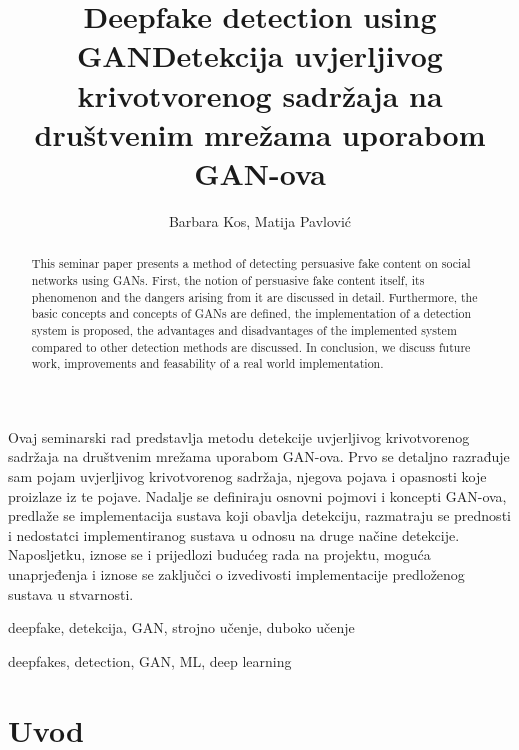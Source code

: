 \documentclass[seminarski, times, utf8]{fer}
\title{Deepfake detection using GAN}
\title{Detekcija uvjerljivog krivotvorenog sadržaja na društvenim mrežama uporabom GAN-ova}
\author{Barbara Kos, Matija Pavlović}
\date{}
\date{}
\begin{document}
\maketitle



\begin{sazetak}
Ovaj seminarski rad predstavlja metodu detekcije uvjerljivog krivotvorenog sadržaja na društvenim mrežama uporabom GAN-ova. Prvo se detaljno razrađuje sam pojam uvjerljivog krivotvorenog sadržaja, njegova pojava i opasnosti koje proizlaze iz te pojave.
Nadalje se definiraju osnovni pojmovi i koncepti GAN-ova, predlaže se implementacija sustava koji obavlja detekciju, razmatraju se prednosti i nedostatci implementiranog sustava u odnosu na druge načine detekcije. 
Naposljetku, iznose se i prijedlozi budućeg rada na projektu, moguća unaprjeđenja i iznose se zaključci o izvedivosti implementacije predloženog sustava u stvarnosti.
\end{sazetak}

\begin{kljucnerijeci}
 deepfake, detekcija, GAN, strojno učenje, duboko učenje
\end{kljucnerijeci}

\begin{abstract}
This seminar paper presents a method of detecting persuasive fake content on social networks using GANs. First, the notion of persuasive fake content itself, its phenomenon and the dangers arising from it are discussed in detail. 
Furthermore, the basic concepts and concepts of GANs are defined, the implementation of a detection system is proposed, the advantages and disadvantages of the implemented system compared to other detection methods are discussed. 
In conclusion, we discuss future work, improvements and feasability of a real world implementation.
\end{abstract}

\begin{keywords}
 deepfakes, detection, GAN, ML, deep learning
\end{keywords}


\tableofcontents


\chapter{Uvod}
\label{pog:uvod}
\end{document}

